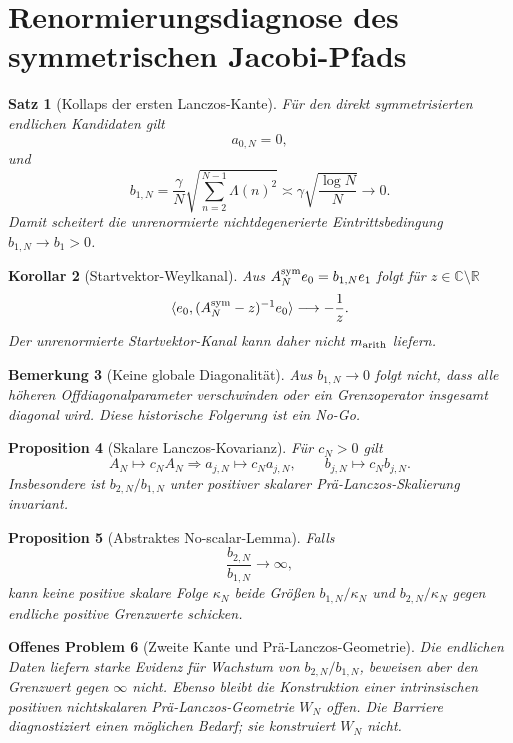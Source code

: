 \documentclass[11pt,a4paper]{amsart}
\newtheorem{theorem}{Satz}[section]
\newtheorem{proposition}[theorem]{Proposition}
\newtheorem{corollary}[theorem]{Korollar}
\newtheorem{remark}[theorem]{Bemerkung}
\newtheorem{openproblem}[theorem]{Offenes Problem}
\begin{document}
\section{Renormierungsdiagnose des symmetrischen Jacobi-Pfads}

\begin{theorem}[Kollaps der ersten Lanczos-Kante]\label{thm:b1-collapse}
Für den direkt symmetrisierten endlichen Kandidaten gilt
\[
  a_{0,N}=0,
\]
und
\[
  b_{1,N}
  =\frac{\gamma}{N}\sqrt{\sum_{n=2}^{N-1}\Lambda(n)^2}
  \asymp\gamma\sqrt{\frac{\log N}{N}}
  \longrightarrow0.
\]
Damit scheitert die unrenormierte nichtdegenerierte Eintrittsbedingung
$b_{1,N}\to b_1>0$.
\end{theorem}

\begin{corollary}[Startvektor-Weylkanal]\label{cor:start-weyl}
Aus $A_N^{\rm sym}e_0=b_{1,N}e_1$ folgt für
$z\in\mathbb C\setminus\mathbb R$
\[
  \langle e_0,(A_N^{\rm sym}-z)^{-1}e_0\rangle
  \longrightarrow-\frac1z.
\]
Der unrenormierte Startvektor-Kanal kann daher nicht $m_{\rm arith}$ liefern.
\end{corollary}

\begin{remark}[Keine globale Diagonalität]\label{rem:no-global-diag}
Aus $b_{1,N}\to0$ folgt nicht, dass alle höheren Offdiagonalparameter
verschwinden oder ein Grenzoperator insgesamt diagonal wird. Diese historische
Folgerung ist ein No-Go.
\end{remark}

\begin{proposition}[Skalare Lanczos-Kovarianz]\label{prop:lanczos-cov}
Für $c_N>0$ gilt
\[
  A_N\mapsto c_NA_N
  \Longrightarrow
  a_{j,N}\mapsto c_Na_{j,N},\qquad
  b_{j,N}\mapsto c_Nb_{j,N}.
\]
Insbesondere ist $b_{2,N}/b_{1,N}$ unter positiver skalarer
Prä-Lanczos-Skalierung invariant.
\end{proposition}

\begin{proposition}[Abstraktes No-scalar-Lemma]\label{prop:no-scalar}
Falls
\[
  \frac{b_{2,N}}{b_{1,N}}\longrightarrow\infty,
\]
kann keine positive skalare Folge $\kappa_N$ beide Größen
$b_{1,N}/\kappa_N$ und $b_{2,N}/\kappa_N$ gegen endliche positive Grenzwerte
schicken.
\end{proposition}

\begin{openproblem}[Zweite Kante und Prä-Lanczos-Geometrie]
\label{op:wn}
Die endlichen Daten liefern starke Evidenz für Wachstum von
$b_{2,N}/b_{1,N}$, beweisen aber den Grenzwert gegen $\infty$ nicht. Ebenso
bleibt die Konstruktion einer intrinsischen positiven nichtskalaren
Prä-Lanczos-Geometrie $W_N$ offen. Die Barriere diagnostiziert einen möglichen
Bedarf; sie konstruiert $W_N$ nicht.
\end{openproblem}
\end{document}
